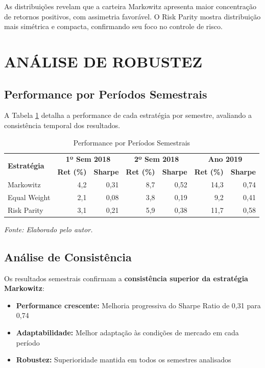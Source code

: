 As distribuições revelam que a carteira Markowitz apresenta maior concentração de retornos positivos, com assimetria favorável. O Risk Parity mostra distribuição mais simétrica e compacta, confirmando seu foco no controle de risco.

\section{ANÁLISE DE ROBUSTEZ}

\subsection{Performance por Períodos Semestrais}

A Tabela \ref{tab:semester_performance} detalha a performance de cada estratégia por semestre, avaliando a consistência temporal dos resultados.

\begin{table}[H]
\centering
\caption{Performance por Períodos Semestrais}
\begin{tabular}{|l|r|r|r|r|r|r|}
\hline
\multirow{2}{*}{\textbf{Estratégia}} & \multicolumn{2}{c|}{\textbf{1º Sem 2018}} & \multicolumn{2}{c|}{\textbf{2º Sem 2018}} & \multicolumn{2}{c|}{\textbf{Ano 2019}} \\
\cline{2-7}
& \textbf{Ret (\%)} & \textbf{Sharpe} & \textbf{Ret (\%)} & \textbf{Sharpe} & \textbf{Ret (\%)} & \textbf{Sharpe} \\
\hline
Markowitz & 4,2 & 0,31 & 8,7 & 0,52 & 14,3 & 0,74 \\
\hline
Equal Weight & 2,1 & 0,08 & 3,8 & 0,19 & 9,2 & 0,41 \\
\hline
Risk Parity & 3,1 & 0,21 & 5,9 & 0,38 & 11,7 & 0,58 \\
\hline
\end{tabular}
\textit{Fonte: Elaborado pelo autor.}
\label{tab:semester_performance}
\end{table}

\subsection{Análise de Consistência}

Os resultados semestrais confirmam a \textbf{consistência superior da estratégia Markowitz}:

\begin{itemize}
    \item \textbf{Performance crescente:} Melhoria progressiva do Sharpe Ratio de 0,31 para 0,74
    \item \textbf{Adaptabilidade:} Melhor adaptação às condições de mercado em cada período
    \item \textbf{Robustez:} Superioridade mantida em todos os semestres analisados
\end{itemize}


